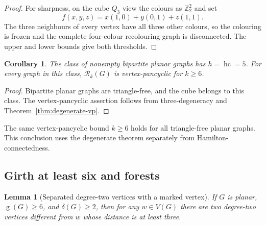 \documentclass[11pt]{article}
\newtheorem{lemma}[theorem]{Lemma}
\newtheorem{corollary}[theorem]{Corollary}
\theoremstyle{remark}
\newcommand{\Rk}{\mathcal R_k}
\newcommand{\hc}{\operatorname{hc}}
\newcommand{\girth}{\operatorname{g}}
\numberwithin{equation}{section}
\begin{document}
\begin{proof}
For sharpness, on the cube $Q_3$ view the colours as
$\mathbb Z_2^2$ and set
\[
 f(x,y,z)=x(1,0)+y(0,1)+z(1,1).
\]
The three neighbours of every vertex have all three other colours,
so the colouring is frozen and the complete four-colour recolouring
graph is disconnected.  The upper and lower bounds give both thresholds.
\end{proof}

\begin{corollary}
The class of nonempty bipartite planar graphs has $h=\hc=5$.
For every graph in this class, $\Rk(G)$ is vertex-pancyclic for
$k\ge6$.
\end{corollary}

\begin{proof}
Bipartite planar graphs are triangle-free, and the cube belongs to this
class.  The vertex-pancyclic assertion follows from three-degeneracy and
Theorem~\ref{thm:degenerate-vp}.
\end{proof}

The same vertex-pancyclic bound $k\ge6$ holds for all triangle-free
planar graphs.  This conclusion uses the degenerate theorem separately
from Hamilton-connectedness.

\subsection{Girth at least six and forests}

\begin{lemma}[Separated degree-two vertices with a marked vertex]
\label{lem:marked-two}
If $G$ is planar, $\girth(G)\ge6$, and $\delta(G)\ge2$, then for
any $w\in V(G)$ there are two degree-two vertices different from
$w$ whose distance is at least three.
\end{lemma}
\end{document}
